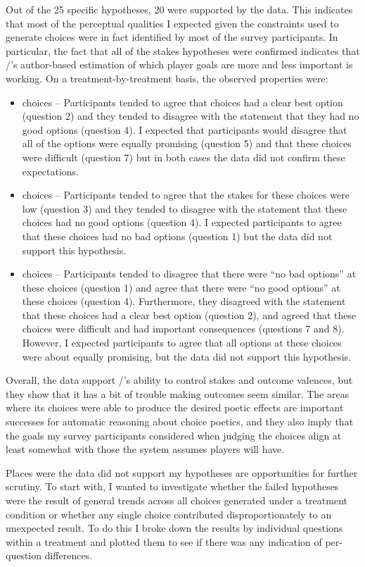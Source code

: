 Out of the 25 specific hypotheses, 20 were supported by the data.
%
This indicates that most of the perceptual qualities I expected given the constraints used to generate choices were in fact identified by most of the survey participants.
%
In particular, the fact that all of the stakes hypotheses were confirmed indicates that \dunyazad/'s author-based estimation of which player goals are more and less important is working.
%
On a treatment-by-treatment basis, the observed properties were:
%
\begin{itemize}
  \item \obv{} choices -- Participants tended to agree that \obv{} choices had a clear best option (question 2) and they tended to disagree with the statement that they had no good options (question 4). I expected that participants would disagree that all of the options were equally promising (question 5) and that these choices were difficult (question 7) but in both cases the data did not confirm these expectations.
  \item \rlx{} choices -- Participants tended to agree that the stakes for these choices were low (question 3) and they tended to disagree with the statement that these choices had no good options (question 4). I expected participants to agree that these choices had no bad options (question 1) but the data did not support this hypothesis.
  \item \dlm{} choices -- Participants tended to disagree that there were ``no bad options'' at these choices (question 1) and agree that there were ``no good options'' at these choices (question 4). Furthermore, they disagreed with the statement that these choices had a clear best option (question 2), and agreed that these choices were difficult and had important consequences (questions 7 and 8). However, I expected participants to agree that all options at these choices were about equally promising, but the data did not support this hypothesis.
\end{itemize}
%
Overall, the data support \dunyazad/'s ability to control stakes and outcome valences, but they show that it has a bit of trouble making outcomes seem similar.
%
The areas where its choices were able to produce the desired poetic effects are important successes for automatic reasoning about choice poetics, and they also imply that the goals my survey participants considered when judging the choices align at least somewhat with those the system assumes players will have.


Places were the data did not support my hypotheses are opportunities for further scrutiny.
%
To start with, I wanted to investigate whether the failed hypotheses were the result of general trends across all choices generated under a treatment condition or whether any single choice contributed disproportionately to an unexpected result.
%
To do this I broke down the results by individual questions within a treatment and plotted them to see if there was any indication of per-question differences.


